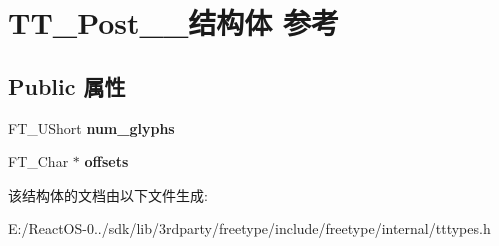 \hypertarget{struct_t_t___post__25__}{}\section{T\+T\+\_\+\+Post\+\_\+\_\+结构体 参考}
\label{struct_t_t___post__25__}
\subsection*{Public 属性}
\begin{DoxyCompactItemize}
\item 
\mbox{\label{struct_t_t___post__25___aae397ce6206c910ecc13f8b46bace595}} 
F\+T\+\_\+\+U\+Short {\bfseries num\+\_\+glyphs}
\item 
\mbox{\label{struct_t_t___post__25___a499ec966b258c8454e9ea8f9455028b6}} 
F\+T\+\_\+\+Char $\ast$ {\bfseries offsets}
\end{DoxyCompactItemize}


该结构体的文档由以下文件生成\+:\begin{DoxyCompactItemize}
\item 
E\+:/\+React\+O\+S-\/0../sdk/lib/3rdparty/freetype/include/freetype/internal/tttypes.\+h\end{DoxyCompactItemize}
